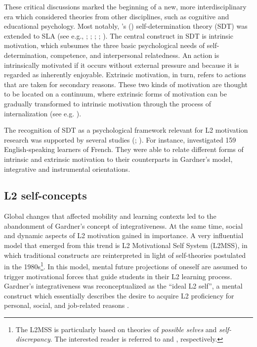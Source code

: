 \documentclass[output=paper]{langscibook}
\begin{document}
These critical discussions marked the beginning of a new, more interdisciplinary era which considered theories from other disciplines, such as cognitive and educational psychology. Most notably, \citeauthor{DeciRyan1985}'s (\citeyear{DeciRyan1985,DeciRyan2002}) self-de\-ter\-mi\-na\-tion theory (SDT) was extended to SLA (see e.g., \citealt{Doernyei1994}; \citealt{Dickinson1995}; \citealt{SchmidtEtAl1996}; \citealt{NoelsEtAl1999}; \citealt{NoelsEtAl2000}). The central construct in SDT is intrinsic motivation, which subsumes the three basic psychological needs of self-determination, competence, and interpersonal relatedness. An action is intrinsically motivated if it occurs without external pressure and because it is regarded as inherently enjoyable. Extrinsic motivation, in turn, refers to actions that are taken for secondary reasons. These two kinds of motivation are thought to be located on a continuum, where extrinsic forms of motivation can be gradually transformed to intrinsic motivation through the process of internalization (see e.g. \citealt{DeciRyan1985}). 

The recognition of SDT as a psychological framework relevant for L2 motivation research was supported by several studies (\citealt{NoelsEtAl2000}; \citealt{Noels2001}). For instance, \citet[72--74]{NoelsEtAl2000} investigated 159 English-speaking learners of French. They were able to relate different forms of intrinsic and extrinsic motivation to their counterparts in Gardner’s model, integrative and instrumental orientations.

\subsection{L2 self-concepts} %

Global changes that affected mobility and learning contexts led to the abandonment of Gardner’s concept of integrativeness. At the same time, social and dynamic aspects of L2 motivation gained in importance. A very influential model that emerged from this trend is  L2 Motivational Self System (L2MSS), in which traditional constructs are reinterpreted in light of self-theories postulated in the 1980s\footnote{The L2MSS is particularly based on theories of \textit{possible selves} and \textit{self-discrepancy}. The interested reader is referred to \citet{MarkusNurius1986} and \citet{Higgins1987}, respectively.}. In this model, mental future projections of oneself are assumed to trigger motivational forces that guide students in their L2 learning process. Gardner’s integrativeness was reconceptualized as the “ideal L2 self”, a mental construct which essentially describes the desire to acquire L2 proficiency for personal, social, and job-related reasons \citep{Doernyei2009}.
\end{document}
